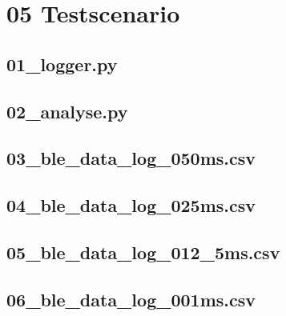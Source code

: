 \newpage 

\section{05 Testscenario}
\label{app:Odner6}
\subsection{01\_logger.py}
\label{app:File61_lg}
\subsection{02\_analyse.py}
\label{app:File62_an}
\subsection{03\_ble\_data\_log\_050ms.csv}
\label{app:File63_50ms}
\subsection{04\_ble\_data\_log\_025ms.csv}
\label{app:File64_25ms}
\subsection{05\_ble\_data\_log\_012\_5ms.csv}
\label{app:File65_12_5ms}
\subsection{06\_ble\_data\_log\_001ms.csv}
\label{app:File66_1ms}
